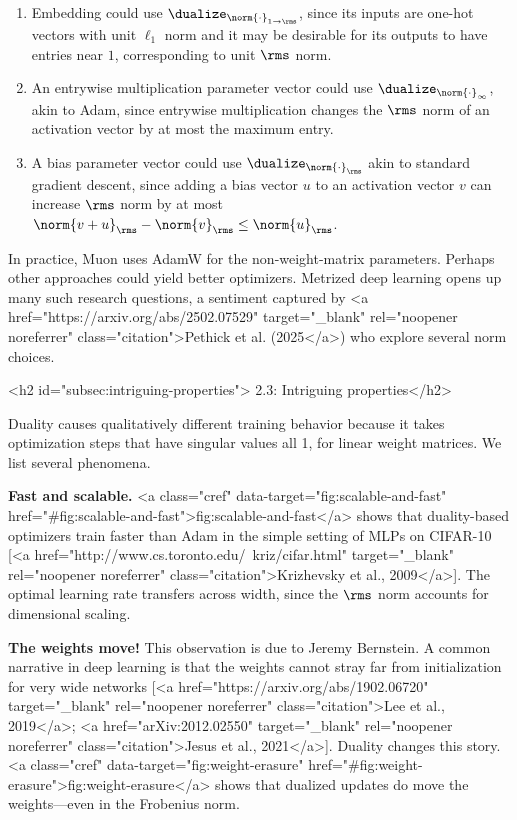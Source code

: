 \begin{enumerate}
    \item Embedding could use $\dualize_{\norm{\cdot}_{1 \to \rms}}$, since its inputs are one-hot vectors with unit $\ell_1$ norm and it may be desirable for its outputs to have entries near $1$, corresponding to unit $\rms$ norm.
    \item An entrywise multiplication parameter vector could use $\dualize_{\norm{\cdot}_\infty}$, akin to Adam, since entrywise multiplication changes the $\rms$ norm of an activation vector by at most the maximum entry.
    \item A bias parameter vector could use $\dualize_{\norm{\cdot}_\rms}$ akin to standard gradient descent, since adding a bias vector $u$ to an activation vector $v$ can increase $\rms$ norm by at most $\norm{v + u}_\rms - \norm{v}_\rms \leq \norm{u}_\rms$.
\end{enumerate}

In practice, Muon uses AdamW for the non-weight-matrix parameters. Perhaps other approaches could yield better optimizers. Metrized deep learning opens up many such research questions, a sentiment captured by <a href="https://arxiv.org/abs/2502.07529" target="_blank" rel="noopener noreferrer" class="citation">Pethick et al. (2025</a>) who explore several norm choices.


<h2 id="subsec:intriguing-properties"> 2.3: Intriguing properties</h2>

Duality causes qualitatively different training behavior because it takes optimization steps that have singular values all 1, for linear weight matrices. We list several phenomena.

\textbf{Fast and scalable.} <a class="cref" data-target="fig:scalable-and-fast" href="#fig:scalable-and-fast">fig:scalable-and-fast</a> shows that duality-based optimizers train faster than Adam in the simple setting of MLPs on CIFAR-10 [<a href="http://www.cs.toronto.edu/~kriz/cifar.html" target="_blank" rel="noopener noreferrer" class="citation">Krizhevsky et al., 2009</a>]. The optimal learning rate transfers across width, since the $\rms$ norm accounts for dimensional scaling.

\textbf{The weights move!} This observation is due to Jeremy Bernstein. A common narrative in deep learning is that the weights cannot stray far from initialization for very wide networks [<a href="https://arxiv.org/abs/1902.06720" target="_blank" rel="noopener noreferrer" class="citation">Lee et al., 2019</a>; <a href="arXiv:2012.02550" target="_blank" rel="noopener noreferrer" class="citation">Jesus et al., 2021</a>]. Duality changes this story. <a class="cref" data-target="fig:weight-erasure" href="#fig:weight-erasure">fig:weight-erasure</a> shows that dualized updates do move the weights---even in the Frobenius norm.

